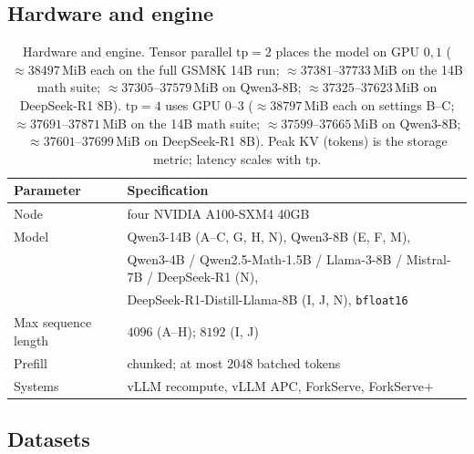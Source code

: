\documentclass[11pt,a4paper]{article}
\begin{document}
\subsection{Hardware and engine}

\begin{table}[h]
\centering
\small
\begin{tabular}{@{}ll@{}}
\toprule
Parameter & Specification \\
\midrule
Node & four NVIDIA A100-SXM4 40GB \\
Model & Qwen3-14B (A--C, G, H, N), Qwen3-8B (E, F, M), \\
      & Qwen3-4B / Qwen2.5-Math-1.5B / Llama-3-8B / Mistral-7B / DeepSeek-R1 (N), \\
      & DeepSeek-R1-Distill-Llama-8B (I, J, N), \texttt{bfloat16} \\
Max sequence length & $4096$ (A--H); $8192$ (I, J) \\
Prefill & chunked; at most $2048$ batched tokens \\
Systems & vLLM recompute, vLLM APC, ForkServe, ForkServe+ \\
\bottomrule
\end{tabular}
\caption{Hardware and engine.
Tensor parallel $\mathrm{tp}{=}2$ places the model on GPU $0,1$ ($\approx 38497$\,MiB each on the full GSM8K 14B run; $\approx 37381$--$37733$\,MiB on the 14B math suite; $\approx 37305$--$37579$\,MiB on Qwen3-8B; $\approx 37325$--$37623$\,MiB on DeepSeek-R1 8B).
$\mathrm{tp}{=}4$ uses GPU $0$--$3$ ($\approx 38797$\,MiB each on settings B--C; $\approx 37691$--$37871$\,MiB on the 14B math suite; $\approx 37599$--$37665$\,MiB on Qwen3-8B; $\approx 37601$--$37699$\,MiB on DeepSeek-R1 8B).
Peak KV (tokens) is the storage metric; latency scales with $\mathrm{tp}$.}
\end{table}

\subsection{Datasets}
\end{document}

